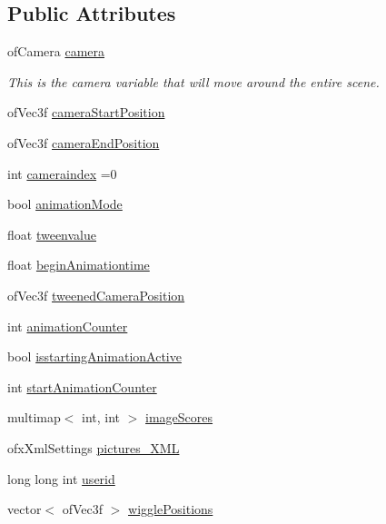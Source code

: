 \subsection*{Public Attributes}
\begin{DoxyCompactItemize}
\item 
of\-Camera \hyperlink{classtest_app_a0278ee237cbbd881252d6273b131bb55}{camera}
\begin{DoxyCompactList}\small\item\em This is the camera variable that will move around the entire scene. \end{DoxyCompactList}\item 
of\-Vec3f \hyperlink{classtest_app_ac01013264b9988207e7fd9e0a486ff2f}{camera\-Start\-Position}
\item 
of\-Vec3f \hyperlink{classtest_app_ad3319d9cd3cb00e898f4f602b879efad}{camera\-End\-Position}
\item 
int \hyperlink{classtest_app_a4ca3a51642dedbf37f2b9f6ef96510c7}{cameraindex} =0
\item 
bool \hyperlink{classtest_app_a2a5d49fd1f7f50f745f56095a1fa0099}{animation\-Mode}
\item 
float \hyperlink{classtest_app_add9ab1aa902948afbdf1c6db0dfde385}{tweenvalue}
\item 
float \hyperlink{classtest_app_adcaa52132409ab0ad077236f9e6fa180}{begin\-Animationtime}
\item 
of\-Vec3f \hyperlink{classtest_app_ae9f60797c1c5d9f1ac06e1d6a5259957}{tweened\-Camera\-Position}
\item 
int \hyperlink{classtest_app_a21b16bdba744425519597fcb925df43a}{animation\-Counter}
\item 
bool \hyperlink{classtest_app_ab8a277e1055730fb5d6786ce0c4804b2}{isstarting\-Animation\-Active}
\item 
int \hyperlink{classtest_app_a577bf117cf10109de967ea0d3ca17f1f}{start\-Animation\-Counter}
\item 
multimap$<$ int, int $>$ \hyperlink{classtest_app_a9ced1a64554a911109fe8a975b95b590}{image\-Scores}
\item 
ofx\-Xml\-Settings \hyperlink{classtest_app_a85133f49103cfa002f39d882f7168236}{pictures\-\_\-\-X\-M\-L}
\item 
long long int \hyperlink{classtest_app_a6ae76dc97fbeee00755f4a6cd6b87e19}{userid}
\item 
vector$<$ of\-Vec3f $>$ \hyperlink{classtest_app_a5495d37f44bb3e3b00a04ad5910e0a6b}{wiggle\-Positions}
\item 

\end{DoxyCompactItemize}
